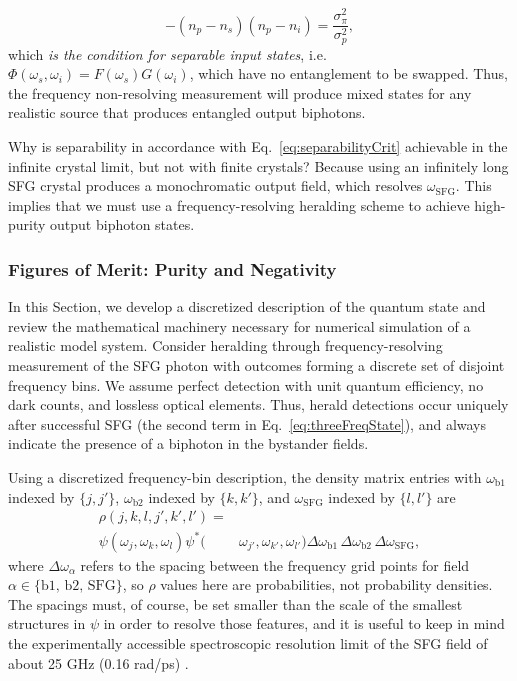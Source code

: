\documentclass[twocolumn,amssymb, nobibnotes, showpacs, aps, pra,10pt]{revtex4-1}
\newcommand*{\wi}{\omega_{i}}
\newcommand*{\ws}{\omega_{s}}
\newcommand*{\wbone}{\omega_{\textrm{b}1}}
\newcommand*{\wbtwo}{\omega_{\textrm{b}2}}
\newcommand*{\wsfg}{\omega_\textrm{SFG}}
\begin{document}
\begin{equation}
-(n_p - n_s) (n_p - n_i) = \frac{\sigma_\pi^2}{\sigma_p^2},
\end{equation}
which \emph{is the condition for separable input states}, i.e.\ $\Phi(\ws,\wi) = F(\ws) G(\wi)$, which have no entanglement to be swapped. Thus, the frequency non-resolving measurement will produce mixed states for any realistic source that produces entangled output biphotons.

Why is separability in accordance with Eq.\ \eqref{eq:separabilityCrit} achievable in the infinite crystal limit, but not with finite crystals? Because using an infinitely long SFG crystal produces a monochromatic output field, which resolves $\wsfg$. This implies that we must use a frequency-resolving heralding scheme to achieve high-purity output biphoton states.

\subsubsection{Figures of Merit: Purity and Negativity}
In this Section, we develop a discretized description of the quantum state and review the mathematical machinery necessary for numerical simulation of a realistic model system. Consider heralding through frequency-resolving measurement of the SFG photon with outcomes forming a discrete set of disjoint frequency bins. We assume perfect detection with unit quantum efficiency, no dark counts, and lossless optical elements. Thus, herald detections occur uniquely after successful SFG (the second term in Eq.\ \eqref{eq:threeFreqState}), and always indicate the presence of a biphoton in the bystander fields.

Using a discretized frequency-bin description, the density matrix entries with $\wbone$ indexed by $\{j,j'\}$, $\wbtwo$ indexed by $\{k,k'\}$, and $\wsfg$ indexed by $\{l,l'\}$ are
\begin{equation} \label{eq:reducedDensityMatrix} 
\begin{split}
\rho(j,k,l,j',k',l')= & \\
\psi(\omega_j, \omega_k, \omega_l) \psi^*(&\omega_{j'}, \omega_{k'}, \omega_{l'}) \Delta \wbone \, \Delta \wbtwo \, \Delta \wsfg,
\end{split}
\end{equation}
where $\Delta \omega_\alpha$ refers to the spacing between the frequency grid points for field $\alpha \in \{\text{b1, b2, SFG}\}$, so $\rho$ values here are probabilities, not probability densities. The spacings must, of course, be set smaller than the scale of the smallest structures in $\psi$ in order to resolve those features, and it is useful to keep in mind the experimentally accessible spectroscopic resolution limit of the SFG field of about 25 GHz (0.16 rad/ps) \cite{Davis2016, Kuo2016}.
\end{document}
